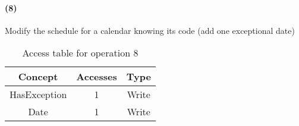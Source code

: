 	\paragraph{(8)} Modify the schedule for a calendar knowing its code (add one exceptional date)
	\begin{table}[h!]
		\centering
		\begin{tabular}{|c|c|c|}
			\hline
			\textbf{Concept} & \textbf{Accesses} & \textbf{Type} \\
			\hline
			HasException & 1 & Write \\ \hline
			Date & 1 & Write \\ \hline
		\end{tabular}
		\caption{Access table for operation 8}\label{tbl:conc.access-8}
	\end{table}